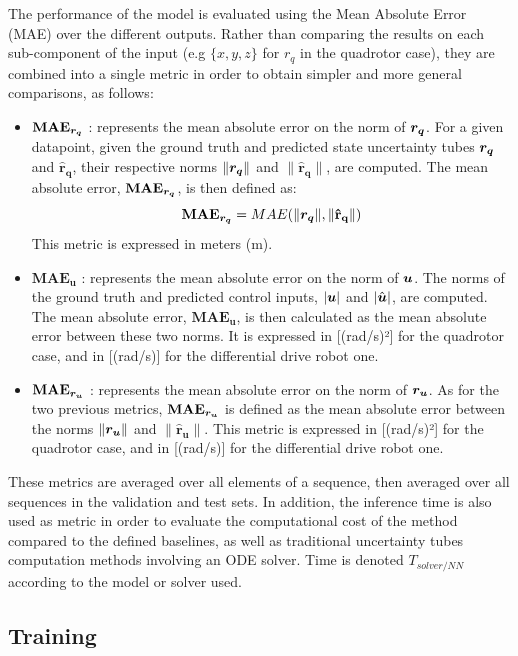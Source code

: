 The performance of the model is evaluated using the Mean Absolute Error (MAE) over the different outputs. 
Rather than comparing the results on each sub-component of the input (e.g $\{x, y, z\}$ for $r_q$ in the quadrotor case), they are combined into a single metric in order to obtain simpler and more general comparisons, as follows:
\begin{itemize}
    \item $\mathbf{MAE_{\boldsymbol{r_q}}}$ : represents the mean absolute error on the norm of $\boldsymbol{r_q}$. 
    For a given datapoint, given the ground truth and predicted state uncertainty tubes $\boldsymbol{r_q}$ and $\mathbf{\hat{r}_q}$, their respective norms $\|\boldsymbol{r_q}\|$ and $\|\mathbf{\hat{r}_q}\|$, are computed. 
    The mean absolute error, $\mathbf{MAE_{\boldsymbol{r_q}}}$, is then defined as:
    \begin{equation}\label{eq:MAE rq}
        \mathbf{MAE_{\boldsymbol{r_q}}} = MAE(\|\boldsymbol{r_q}\|, \|\mathbf{\hat{r}_q}\|)
    \end{equation}
    This metric is expressed in meters (m).
    \item $\mathbf{MAE_{u}}$ : represents the mean absolute error on the norm of $\boldsymbol{u}$. 
    The norms of the ground truth and predicted control inputs, $|\boldsymbol{u}|$ and $|\hat{\boldsymbol{u}}|$, are computed. 
    The mean absolute error, $\mathbf{MAE_{u}}$, is then calculated as the mean absolute error between these two norms. 
    It is expressed in [(rad/s)²] for the quadrotor case, and in [(rad/s)] for the differential drive robot one.
    \item $\mathbf{MAE_{\boldsymbol{r_u}}}$ : represents the mean absolute error on the norm of $\boldsymbol{r_u}$. 
    As for the two previous metrics, $\mathbf{MAE_{\boldsymbol{r_u}}}$ is defined as the mean absolute error between the norms $\|\boldsymbol{r_u}\|$ and $\|\mathbf{\hat{r}_u}\|$. 
    This metric is expressed in [(rad/s)²] for the quadrotor case, and in [(rad/s)] for the differential drive robot one.
\end{itemize}

These metrics are averaged over all elements of a sequence, then averaged over all sequences in the validation and test sets. 
In addition, the inference time is also used as metric in order to evaluate the computational cost of the method compared to the defined baselines, as well as traditional uncertainty tubes computation methods involving an ODE solver. 
Time is denoted $T_{solver/NN}$ according to the model or solver used.

\subsection{Training}

